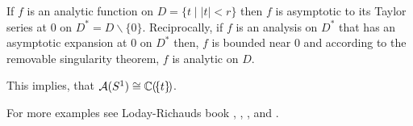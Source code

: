 \begin{exmp}
  If $f$ is an analytic function on $D=\{t\mid |t|<r\}$ then $f$ is asymptotic
  to its Taylor series at $0$ on $D^*=D\backslash\{0\}$. Reciprocally, if $f$
  is an analysis on $D^*$ that has an asymptotic expansion at $0$ on $D^*$
  then, $f$ is bounded near $0$ and according to the removable singularity
  theorem, $f$ is analytic on $D$.
  \begin{rem}
    This implies, that $\mathcal{A}(S^1)\cong\mathbb{C}(\!\{t\}\!)$.
  \end{rem}
\end{exmp}
For more examples see Loday-Richauds book \cite{Loday2014}
\cite[Exmp.2.2.4]{Loday2014}, \cite[Exmp.2.2.5]{Loday2014},
\cite[Exmp.2.2.6]{Loday2014}, \cite[Exmp.2.2.7]{Loday2014} and
\cite[Exmp.2.2.8]{Loday2014}.
\begin{comment}
  \begin{exmp}[Fundamental example: the Euler function]
    \marginnote{\cite[Exmp.2.2.4]{Loday2014}}
    Consider the Euler equation
    \begin{equation}
      x^2\frac{dy}{dx}+y=x \,.
    \end{equation}
    \TODO[]
  \end{exmp}
  \begin{exmp}[Classical example: the exponential integral]
    \marginnote{\cite[Exmp.2.2.5]{Loday2014}}
    Consider the exponential integral
    \begin{equation}
      Ei(x)=\int_x^{+\infty}e^{-t}\frac{dt}{t} \,.
    \end{equation}
    \TODO[]
  \end{exmp}
  \begin{exmp}[A generalized hypergeometric series ${}_3F_0$]
    \marginnote{\cite[Exmp.2.2.6]{Loday2014}}
    \TODO[]
  \end{exmp}
  \begin{exmp}[A series of a mild difference equation]
    \marginnote{\cite[Exmp.2.2.7]{Loday2014}}
    \TODO[]
  \end{exmp}
  \begin{exmp}[A series of a wild difference equation]
    \marginnote{\cite[Exmp.2.2.8]{Loday2014}}
    \TODO[]
  \end{exmp}
\end{comment}

